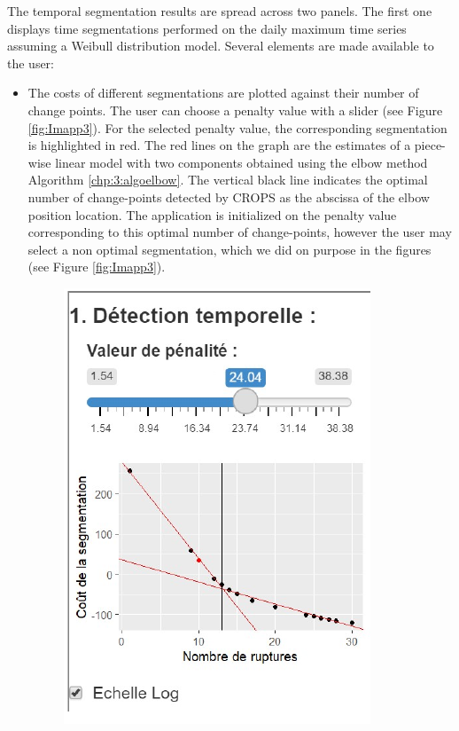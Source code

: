  
The temporal segmentation results are spread across two panels. The first one displays time segmentations performed on the daily maximum time series assuming a Weibull distribution model. Several elements are made available to the user:
\begin{itemize}
\item The costs of different segmentations are plotted against their number of change points. The user can choose a penalty value with a slider (see Figure \ref{fig:Imapp3}). For the selected penalty value, the corresponding segmentation is highlighted in red. The red lines on the graph are the estimates of a piece-wise linear model with two components obtained using the elbow method Algorithm \ref{chp:3:algoelbow}. The vertical black line indicates the optimal number of change-points detected by CROPS as the abscissa of the elbow position location. The application is initialized on the penalty value corresponding to this optimal number of change-points, however the user may select a non optimal segmentation, which we did on purpose in the figures (see Figure \ref{fig:Imapp3}). 
\begin{figure}[htbp]
  \centering
  \includegraphics[]{figs/Chap6/Im_appbis3.pdf}

\end{figure}
\end{itemize}
